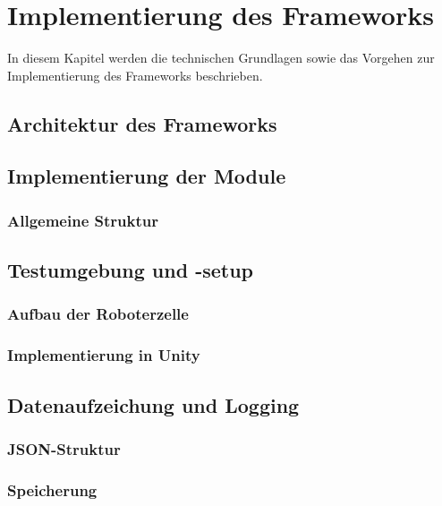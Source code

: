 \chapter{Implementierung des Frameworks}
\label{cap:framework}
In diesem Kapitel werden die technischen Grundlagen sowie das Vorgehen zur
Implementierung des Frameworks beschrieben.

\section{Architektur des Frameworks}
\label{sec:architektur_frameowork}


\section{Implementierung der Module}

\subsection{Allgemeine Struktur}







\section{Testumgebung und -setup}
\subsection{Aufbau der Roboterzelle}
\subsection{Implementierung in Unity}
\section{Datenaufzeichung und Logging}
\subsection{JSON-Struktur}
\subsection{Speicherung}
